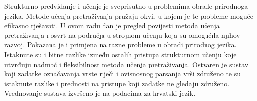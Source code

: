 \begin{sazetak}
Strukturno predviđanje i učenje je sveprisutno u problemima obrade prirodnoga
jezika. Metode učenja pretraživanja pružaju okvir u kojem je te probleme moguće
efikasno rješavati. U ovom radu dan je pregled povijesti metoda učenja
pretraživanja i osvrt na područja u strojnom učenju koja su omogućila njihov
razvoj. Pokazana je i primjena na razne probleme u obradi prirodnog jezika.
Istaknute su i bitne razlike između ostalih pristupa strukturnom učenju koje
utvrđuju nadmoć i fleksibilnost metoda učenja pretraživanja. Ostvaren je
sustav koji zadatke označavanja vrste riječi i ovisnosnog parsanja vrši
združeno te su istaknute razlike i prednosti na pristupe koji zadatke ne gledaju
združeno. Vrednovanje sustava izvršeno je na podacima za hrvatski jezik.

\end{sazetak}
